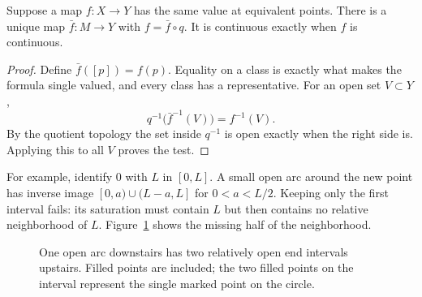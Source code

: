 \begin{proposition}\label{D-quotient-test}
Suppose a map $f:X\to Y$ has the same value at equivalent points. There is a unique map $\bar f:M\to Y$ with $f=\bar f\circ q$. It is continuous exactly when $f$ is continuous.
\end{proposition}
\begin{proof}
Define $\bar f([p])=f(p)$. Equality on a class is exactly what makes the formula single valued, and every class has a representative. For an open set $V\subset Y$,
\[
 q^{-1}\big(\bar f^{-1}(V)\big)=f^{-1}(V).
\]
By the quotient topology the set inside $q^{-1}$ is open exactly when the right side is. Applying this to all $V$ proves the test.
\end{proof}

For example, identify $0$ with $L$ in $[0,L]$. A small open arc around the new point has inverse image $[0,a)\cup(L-a,L]$ for $0<a<L/2$. Keeping only the first interval fails: its saturation must contain $L$ but then contains no relative neighborhood of $L$. Figure~\ref{D-arc-figure} shows the missing half of the neighborhood.

\begin{figure}[htbp]\centering
{}
\caption{One open arc downstairs has two relatively open end intervals upstairs. Filled points are included; the two filled points on the interval represent the single marked point on the circle.}\label{D-arc-figure}
\end{figure}

